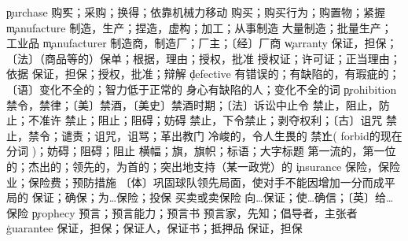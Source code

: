 \begin{multicols}{2}
\c{purchase}  \v 购买；采购；换得；依靠机械力移动 \n 购买；购买行为；购置物；紧握
\c{manufacture}  \vt 制造，生产；捏造，虚构；加工；从事制造 \n 大量制造；批量生产；工业品
\c{manufacturer}  \n 制造商，制造厂；厂主；〔经〕厂商
\c{warranty}  \n 保证，担保；〔法〕（商品等的）保单；根据，理由；授权，批准
  \n 授权证；许可证；正当理由；依据 \vt 保证，担保；授权，批准；辩解
\c{defective}  \a 有错误的；有缺陷的，有瑕疵的；〔语〕变化不全的；智力低于正常的 \n 身心有缺陷的人；变化不全的词
\c{prohibition}  \n 禁令，禁律；〔美〕禁酒，〔美史〕禁酒时期；〔法〕诉讼中止令
  \vt 禁止，阻止，防止；不准许
  \vt 禁止；阻止；阻碍；妨碍
  \vt 禁止，下令禁止；剥夺权利；〔古〕诅咒 \n 禁止，禁令；谴责；诅咒，诅骂；革出教门
  \a 冷峻的，令人生畏的 \v 禁止( forbid的现在分词 )；妨碍；阻碍；阻止
  \n 横幅；旗，旗帜；标语；大字标题 \a 第一流的，第一位的；杰出的；领先的，为首的；突出地支持（某一政党）的 
\c{insurance}  \n 保险，保险业；保险费；预防措施 \a 〔体〕巩固球队领先局面，使对手不能因增加一分而成平局的 
  \vt 保证；确保；为…保险；投保 \vi 买卖或卖保险
  \vt 向…保证；使…确信；〔英〕给…保险
\c{prophecy}  \n 预言；预言能力；预言书
  \n 预言家，先知；倡导者，主张者
\c{guarantee}  \n 保证，担保；保证人，保证书；抵押品 \vt 保证，担保


\end{multicols}
